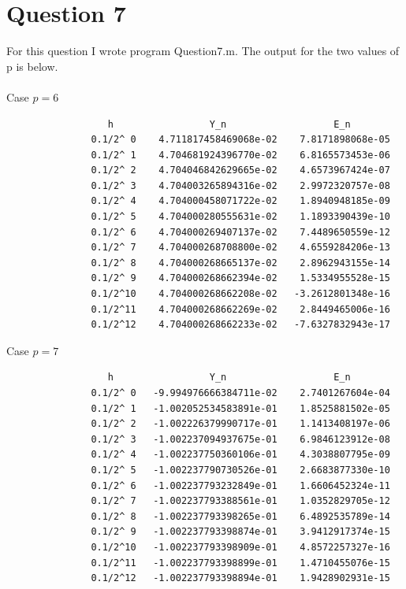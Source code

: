 \documentclass[a4paper]{article}
\begin{document}
\pagebreak
\section*{Question 7}
For this question I wrote program Question\textunderscore7.m. The output for the two values of p is below.
\\ \\
Case $p=6$
\begin{table}[H]
\begin{verbatim}
                  h                 Y_n                   E_n 
               0.1/2^ 0    4.711817458469068e-02    7.8171898068e-05 
               0.1/2^ 1    4.704681924396770e-02    6.8165573453e-06 
               0.1/2^ 2    4.704046842629665e-02    4.6573967424e-07 
               0.1/2^ 3    4.704003265894316e-02    2.9972320757e-08 
               0.1/2^ 4    4.704000458071722e-02    1.8940948185e-09 
               0.1/2^ 5    4.704000280555631e-02    1.1893390439e-10 
               0.1/2^ 6    4.704000269407137e-02    7.4489650559e-12 
               0.1/2^ 7    4.704000268708800e-02    4.6559284206e-13 
               0.1/2^ 8    4.704000268665137e-02    2.8962943155e-14 
               0.1/2^ 9    4.704000268662394e-02    1.5334955528e-15 
               0.1/2^10    4.704000268662208e-02   -3.2612801348e-16 
               0.1/2^11    4.704000268662269e-02    2.8449465006e-16 
               0.1/2^12    4.704000268662233e-02   -7.6327832943e-17
\end{verbatim}
\caption{Output from Question\textunderscore7.m for $p=0.6$}
\end{table}

Case $p=7$
\begin{table}[H]
\begin{verbatim}
                  h                 Y_n                   E_n 
               0.1/2^ 0   -9.994976666384711e-02    2.7401267604e-04 
               0.1/2^ 1   -1.002052534583891e-01    1.8525881502e-05 
               0.1/2^ 2   -1.002226379990717e-01    1.1413408197e-06 
               0.1/2^ 3   -1.002237094937675e-01    6.9846123912e-08 
               0.1/2^ 4   -1.002237750360106e-01    4.3038807795e-09 
               0.1/2^ 5   -1.002237790730526e-01    2.6683877330e-10 
               0.1/2^ 6   -1.002237793232849e-01    1.6606452324e-11 
               0.1/2^ 7   -1.002237793388561e-01    1.0352829705e-12 
               0.1/2^ 8   -1.002237793398265e-01    6.4892535789e-14 
               0.1/2^ 9   -1.002237793398874e-01    3.9412917374e-15 
               0.1/2^10   -1.002237793398909e-01    4.8572257327e-16 
               0.1/2^11   -1.002237793398899e-01    1.4710455076e-15 
               0.1/2^12   -1.002237793398894e-01    1.9428902931e-15 
\end{verbatim}
\caption{Output from Question\textunderscore7.m for $p=0.7$}
\end{table}
\end{document}
